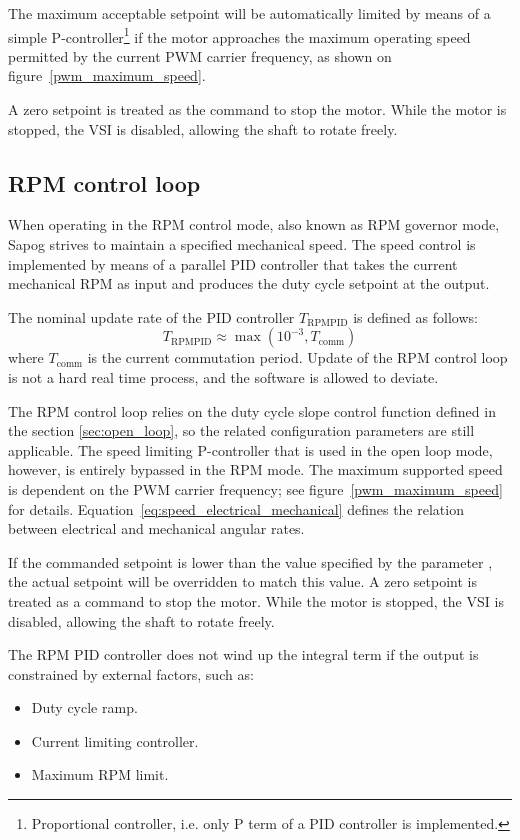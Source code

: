 \documentclass{zubaxdoc}
\begin{document}
The maximum acceptable setpoint will be automatically limited by means of a simple
P-controller\footnote{Proportional controller, i.e. only P term of a PID controller is implemented.}
if the motor approaches the maximum operating speed permitted by the
current PWM carrier frequency, as shown on figure~\ref{pwm_maximum_speed}.

A zero setpoint is treated as the command to stop the motor.
While the motor is stopped, the VSI is disabled, allowing the shaft to rotate freely.

\subsection{RPM control loop}\label{sec:rpm_loop}

When operating in the RPM control mode, also known as RPM governor mode,
Sapog strives to maintain a specified mechanical speed.
The speed control is implemented by means of a parallel PID controller
that takes the current mechanical RPM as input and
produces the duty cycle setpoint at the output.

The nominal update rate of the PID controller $T_{\text{RPMPID}}$ is defined as follows:
\begin{equation}\label{eq:rpm_pid_control_loop_period}
	T_{\text{RPMPID}} \approx \max \left(10^{-3},T_{\text{comm}}\right)
\end{equation}
where $T_\text{comm}$ is the current commutation period.
Update of the RPM control loop is not a hard real time process, and the software is allowed to
deviate.

The RPM control loop relies on the duty cycle slope control function defined in the section
\ref{sec:open_loop}, so the related configuration parameters are still applicable.
The speed limiting P-controller that is used in the open loop mode, however,
is entirely bypassed in the RPM mode.
The maximum supported speed is dependent on the PWM carrier frequency;
see figure~\ref{pwm_maximum_speed} for details.
Equation~\ref{eq:speed_electrical_mechanical} defines the relation between electrical
and mechanical angular rates.

If the commanded setpoint is lower than the value specified by the parameter \mbox{,}
the actual setpoint will be overridden to match this value.
A zero setpoint is treated as a command to stop the motor.
While the motor is stopped, the VSI is disabled, allowing the shaft to rotate freely.

The RPM PID controller does not wind up the integral term if the output is constrained by external factors,
such as:
\begin{itemize}
	\item Duty cycle ramp.
	\item Current limiting controller.
	\item Maximum RPM limit.
\end{itemize}
\end{document}
